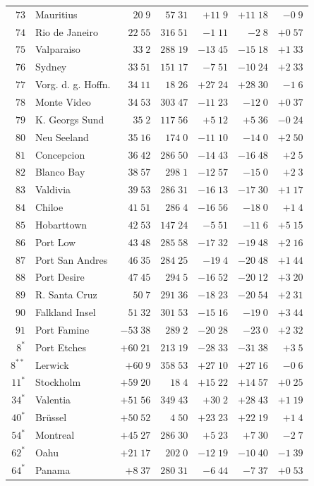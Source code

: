 \begin{center}
\begin{tabular}{rl|r|r||r|r|r}
$73$&Mauritius&$20\;9$&$57\;31$&$+11\;9$&$+11\;18$&$-0\;9$\\
$74$&Rio de Janeiro&$22\;55$&$316\;51$&$-1\;11$&$-2\;8$&$+0\;57$\\
$75$&Valparaiso&$33\;2$&$288\;19$&$-13\;45$&$-15\;18$&$+1\;33$\\
$76$&Sydney&$33\;51$&$151\;17$&$-7\;51$&$-10\;24$&$+2\;33$\\
$77$&Vorg. d. g. Hoffn.&$34\;11$&$18\;26$&$+27\;24$&$+28\;30$&$-1\;6$\\
$78$&Monte Video&$34\;53$&$303\;47$&$-11\;23$&$-12\;0$&$+0\;37$\\
$79$&K. Georgs Sund&$35\;2$&$117\;56$&$+5\;12$&$+5\;36$&$-0\;24$\\
$80$&Neu Seeland&$35\;16$&$174\;0$&$-11\;10$&$-14\;0$&$+2\;50$\\[2pt]
$81$&Concepcion&$36\;42$&$286\;50$&$-14\;43$&$-16\;48$&$+2\;5$\\
$82$&Blanco Bay&$38\;57$&$298\;1$&$-12\;57$&$-15\;0$&$+2\;3$\\
$83$&Valdivia&$39\;53$&$286\;31$&$-16\;13$&$-17\;30$&$+1\;17$\\
$84$&Chiloe&$41\;51$&$286\;4$&$-16\;56$&$-18\;0$&$+1\;4$\\
$85$&Hobarttown&$42\;53$&$147\;24$&$-5\;51$&$-11\;6$&$+5\;15$\\
$86$&Port Low&$43\;48$&$285\;58$&$-17\;32$&$-19\;48$&$+2\;16$\\
$87$&Port San Andres&$46\;35$&$284\;25$&$-19\;4$&$-20\;48$&$+1\;44$\\
$88$&Port Desire&$47\;45$&$294\;5$&$-16\;52$&$-20\;12$&$+3\;20$\\
$89$&R. Santa Cruz&$50\;7$&$291\;36$&$-18\;23$&$-20\;54$&$+2\;31$\\
$90$&Falkland Insel&$51\;32$&$301\;53$&$-15\;16$&$-19\;0$&$+3\;44$\\[2pt]
$91$&Port Famine&$-53\;38$&$289\;2$&$-20\;28$&$-23\;0$&$+2\;32$\\[2pt]
$8^{\ast}$&Port Etches&$+60\;21$&$213\;19$&$-28\;33$&$-31\;38$&$+3\;5$\\
$8^{\ast\ast}$&Lerwick&$+60\;9$&$358\;53$&$+27\;10$&$+27\;16$&$-0\;6$\\
$11^{\ast}$&Stockholm&$+59\;20$&$18\;4$&$+15\;22$&$+14\;57$&$+0\;25$\\
$34^{\ast}$&Valentia&$+51\;56$&$349\;43$&$+30\;2$&$+28\;43$&$+1\;19$\\
$40^{\ast}$&Brüssel&$+50\;52$&$4\;50$&$+23\;23$&$+22\;19$&$+1\;4$\\
$54^{\ast}$&Montreal&$+45\;27$&$286\;30$&$+5\;23$&$+7\;30$&$-2\;7$\\
$62^{\ast}$&Oahu&$+21\;17$&$202\;0$&$-12\;19$&$-10\;40$&$-1\;39$\\
$64^{\ast}$&Panama&$+8\;37$&$280\;31$&$-6\;44$&$-7\;37$&$+0\;53$\\
\hline
\end{tabular}
\end{center}
\endgroup

